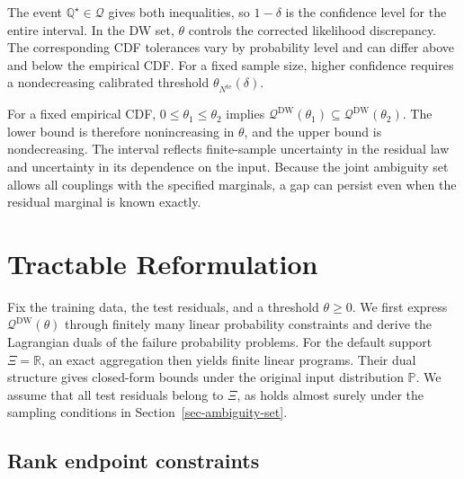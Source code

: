 \documentclass[review,11pt,3p,authoryear,nopreprintline]{elsarticle}
\begin{document}
The event $\mathbb Q^\star\in\mathscr Q$ gives both inequalities, so $1-\delta$ is the confidence level for the entire interval. In the DW set, $\theta$ controls the corrected likelihood discrepancy. The corresponding CDF tolerances vary by probability level and can differ above and below the empirical CDF. For a fixed sample size, higher confidence requires a nondecreasing calibrated threshold $\theta_{N^{\mathrm{te}}}(\delta)$.

For a fixed empirical CDF, $0\le\theta_1\le\theta_2$ implies $\mathscr Q^{\mathrm{DW}}(\theta_1)\subseteq\mathscr Q^{\mathrm{DW}}(\theta_2)$. The lower bound is therefore nonincreasing in $\theta$, and the upper bound is nondecreasing. The interval reflects finite-sample uncertainty in the residual law and uncertainty in its dependence on the input. Because the joint ambiguity set allows all couplings with the specified marginals, a gap can persist even when the residual marginal is known exactly.

\section{Tractable Reformulation}
\label{sec-reformulation}

Fix the training data, the test residuals, and a threshold $\theta\ge0$. We first express $\mathscr Q^{\mathrm{DW}}(\theta)$ through finitely many linear probability constraints and derive the Lagrangian duals of the failure probability problems. For the default support $\Xi=\mathbb R$, an exact aggregation then yields finite linear programs. Their dual structure gives closed-form bounds under the original input distribution $\mathbb P$. We assume that all test residuals belong to $\Xi$, as holds almost surely under the sampling conditions in Section~\ref{sec-ambiguity-set}.

\subsection{Rank endpoint constraints}
\label{subsec-rank-constraints}
\end{document}
